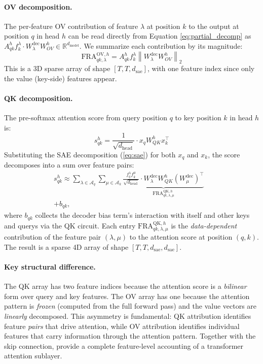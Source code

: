 \documentclass{article}
\theoremstyle{plain}
\theoremstyle{definition}
\theoremstyle{remark}
\newcommand{\WOV}{W_{OV}}
\newcommand{\WQK}{W_{QK}}
\newcommand{\dhead}{d_{\mathrm{head}}}
\newcommand{\dsae}{d_{\mathrm{sae}}}
\newcommand{\RR}{\mathbb{R}}
\begin{document}
\paragraph{OV decomposition.} The per-feature OV contribution of feature $\lambda$ at position $k$ to the output at position $q$ in head $h$ can be read directly from Equation \eqref{eq:partial_decomp} as $A^h_{qk} f_k^\lambda \cdot W^{\mathrm{dec}}_\lambda \WOV^h\in\RR^{d_\text{model}}$. We summarize each contribution by its magnitude:
\begin{equation}
    \mathrm{FRA}^{\mathrm{OV},h}_{qk,\lambda} = A^h_{qk} f_k^\lambda \left\lVert W^{\mathrm{dec}}_\lambda \WOV^h \right\rVert_2
    \label{eq:ov_fra}
\end{equation}
This is a 3D sparse array of shape $[T, T, \dsae]$, with one feature index since only the value (key-side) features appear.

\paragraph{QK decomposition.} The pre-softmax attention score from query position $q$ to key position $k$ in head $h$ is:
\begin{equation}
    s^h_{qk} = \frac{1}{\sqrt{\dhead}} \cdot x_q \WQK^h x_k^\top
    \label{eq:attn_score}
\end{equation}
Substituting the SAE decomposition (\eqref{eq:sae}) for both $x_q$ and $x_k$, the score decomposes into a sum over feature pairs:
\begin{equation}
\begin{aligned}
        s^h_{qk} \approx \sum_{\lambda \in \mathcal{A}_q} \sum_{\mu \in \mathcal{A}_k} \underbrace{\frac{f_q^\lambda f_k^\mu}{\sqrt{\dhead}} \cdot W^{\mathrm{dec}}_\lambda \WQK^h (W^{\mathrm{dec}}_\mu)^\top}_{\mathrm{FRA}^{\mathrm{QK},h}_{qk,\lambda,\mu}}&\\ + b_{qk},
\end{aligned}
    \label{eq:qk_fra}
\end{equation}
where $b_{qk}$ collects the decoder bias term's interaction with itself and other keys and querys via the QK circuit. Each entry $\mathrm{FRA}^{\mathrm{QK},h}_{qk,\lambda,\mu}$ is the \emph{data-dependent} contribution of the feature pair $(\lambda, \mu)$ to the attention score at position $(q,k)$. The result is a sparse 4D array of shape $[T, T, \dsae, \dsae]$.

\paragraph{Key structural difference.} The QK array has two feature indices because the attention score is a \emph{bilinear} form over query and key features. The OV array has one because the attention pattern is \emph{frozen} (computed from the full forward pass) and the value vectors are \emph{linearly} decomposed. This asymmetry is fundamental: QK attribution identifies feature \emph{pairs} that drive attention, while OV attribution identifies individual features that carry information through the attention pattern. Together with the skip connection,  provide a complete feature-level accounting of a transformer attention sublayer.
\end{document}
